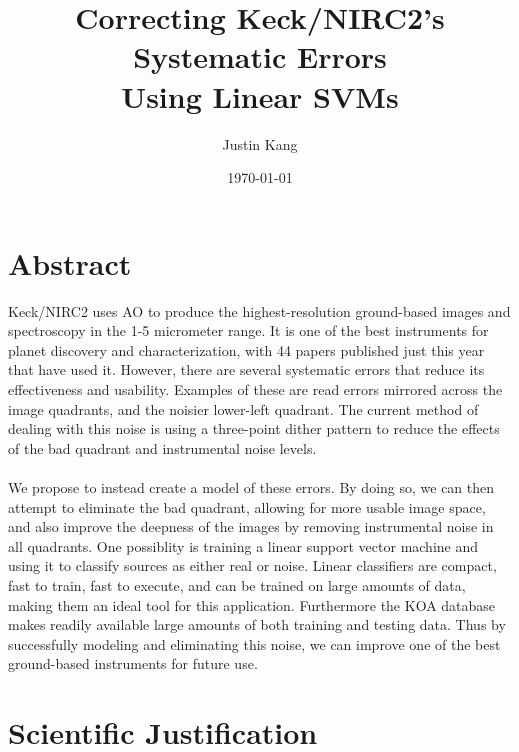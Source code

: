 \documentclass[12pt]{article}
\title{\vspace{-2em} \Large \textbf{Correcting Keck/NIRC2's Systematic Errors \\ Using Linear SVMs}}
\author{Justin Kang}
\date{\vspace{-0.75em} \today}
\begin{document}
\maketitle


\vspace{-2em}
\section*{Abstract}
\noindent Keck/NIRC2 uses AO to produce the highest-resolution ground-based images and spectroscopy in the 1-5 micrometer range. It is one of the best instruments for planet discovery and characterization, with 44 papers published just this year that have used it. However, there are several systematic errors that reduce its effectiveness and usability. Examples of these are read errors mirrored across the image quadrants, and the noisier lower-left quadrant. The current method of dealing with this noise is using a three-point dither pattern to reduce the effects of the bad quadrant and instrumental noise levels.\\\\ 
We propose to instead create a model of these errors. By doing so, we can then attempt to eliminate the bad quadrant, allowing for more usable image space, and also improve the deepness of the images by removing instrumental noise in all quadrants. One possiblity is training a linear support vector machine and using it to classify sources as either real or noise. Linear classifiers are compact, fast to train, fast to execute, and can be trained on large amounts of data, making them an ideal tool for this application. Furthermore the KOA database makes readily available large amounts of both training and testing data. Thus by successfully modeling and eliminating this noise, we can improve one of the best ground-based instruments for future use.


\newpage
\section*{Scientific Justification}
\end{document}
